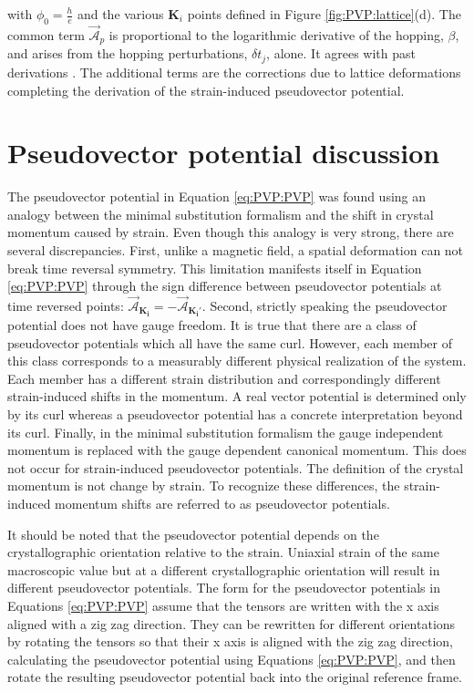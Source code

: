 with $\phi_0=\frac{h}{e}$ and the various $\bm{K}_i$ points defined in Figure \ref{fig:PVP:lattice}(d).
The common term $\vec{\mathcal{A}}_p$ is proportional to the logarithmic derivative of the hopping, $\beta$, and arises from the hopping perturbations, $\delta t_j$, alone.
It agrees with past derivations \cite{CastroNeto2009,Vozmediano2010}. 
The additional terms are the corrections due to lattice deformations completing the derivation of the strain-induced pseudovector potential.

\section{Pseudovector potential discussion}
The pseudovector potential in Equation \ref{eq:PVP:PVP} was found using an analogy between the minimal substitution formalism and the shift in crystal momentum caused by strain.
Even though this analogy is very strong, there are several discrepancies.
First, unlike a magnetic field, a spatial deformation can not break time reversal symmetry.
This limitation manifests itself in Equation \ref{eq:PVP:PVP} through the sign difference between pseudovector potentials at time reversed points: $\vec{\mathcal{A}}_{\bm{K_i}} = - \vec{\mathcal{A}}_{\bm{K_i'}}$.
Second, strictly speaking the pseudovector potential does not have gauge freedom.
It is true that there are a class of pseudovector potentials which all have the same curl.
However, each member of this class corresponds to a measurably different physical realization of the system.
Each member has a different strain distribution and correspondingly different strain-induced shifts in the momentum.
A real vector potential is determined only by its curl whereas a pseudovector potential has a concrete interpretation beyond its curl.
Finally, in the minimal substitution formalism the gauge independent momentum is replaced with the gauge dependent canonical momentum. 
This does not occur for strain-induced pseudovector potentials.
The definition of the crystal momentum is not change by strain.
To recognize these differences, the strain-induced momentum shifts are referred to as pseudovector potentials.

It should be noted that the pseudovector potential depends on the crystallographic orientation relative to the strain.
Uniaxial strain of the same macroscopic value but at a different crystallographic orientation will result in different pseudovector potentials.
The form for the pseudovector potentials in Equations \ref{eq:PVP:PVP} assume that the tensors are written with the x axis aligned with a zig zag direction.
They can be rewritten for different orientations by rotating the tensors so that their x axis is aligned with the zig zag direction, calculating the pseudovector potential using Equations \ref{eq:PVP:PVP}, and then rotate the resulting pseudovector potential back into the original reference frame.

